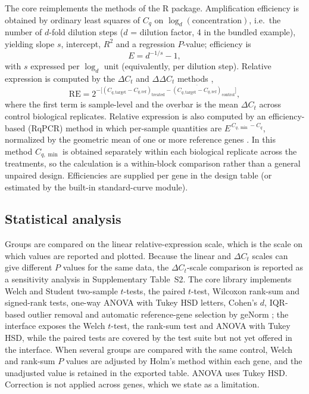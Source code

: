 The core reimplements the methods of the R package. Amplification efficiency
is obtained by ordinary least squares of $C_q$ on
$\log_{d}(\text{concentration})$, i.e.\ the number of $d$-fold dilution
steps ($d$ = dilution factor, 4 in the bundled example), yielding slope $s$,
intercept, $R^2$ and a regression $P$-value; efficiency is
\begin{equation}
E = d^{-1/s} - 1,
\end{equation}
with $s$ expressed per $\log_d$ unit (equivalently, per dilution step).
Relative expression is computed by the
$\Delta C_t$ and $\Delta\Delta C_t$ methods \cite{livak2001analysis},
\begin{equation}
\mathrm{RE} = 2^{-\big[(C_{q,\mathrm{target}}-C_{q,\mathrm{ref}})_{\mathrm{treated}}
- \overline{(C_{q,\mathrm{target}}-C_{q,\mathrm{ref}})}_{\mathrm{control}}\big]},
\end{equation}
where the first term is sample-level and the overbar is the mean $\Delta C_t$
across control biological replicates. Relative expression is also computed
by an efficiency-based (RqPCR) method \cite{rancurel2019satqpcr} in which
per-sample quantities are $E^{\,C_{q,\min}-C_q}$, normalized by the geometric
mean of one or more reference genes \cite{pfaffl2001new}. In this method
$C_{q,\min}$ is obtained separately within each biological replicate across
the treatments, so the calculation is a within-block comparison rather than a
general unpaired design. Efficiencies are supplied per gene in the design
table (or estimated by the built-in standard-curve module).

\subsection{Statistical analysis}

{\sloppy Groups are compared on the linear relative-expression scale, which is
the scale on which values are reported and plotted. Because the linear and
$\Delta C_t$ scales can give different $P$ values for the same data, the
$\Delta C_t$-scale comparison is reported as a sensitivity analysis in
Supplementary Table~S2. The core
library implements Welch and Student two-sample $t$-tests, the paired
$t$-test, Wilcoxon rank-sum and signed-rank tests, one-way ANOVA with Tukey
HSD letters, Cohen's $d$, IQR-based outlier removal and automatic
reference-gene selection by geNorm \cite{vandesompele2002accurate}; the
interface exposes the Welch $t$-test, the rank-sum test and ANOVA with Tukey
HSD, while the paired tests are covered by the test suite but not yet offered
in the interface. When several groups are compared with the same control,
Welch and rank-sum $P$ values are adjusted by Holm's method within each gene,
and the unadjusted value is retained in the exported table. ANOVA uses Tukey
HSD. Correction is not applied across genes, which we state as a
limitation.\par}

